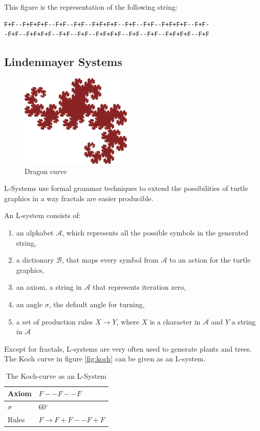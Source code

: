 \documentclass[11pt,a4paper]{article}
\newcommand{\degree}{\ensuremath{^\circ}}
\begin{document}
This figure is the representation of the following string:
\begin{verbatim}
F+F--F+F+F+F--F+F--F+F--F+F+F+F--F+F--F+F--F+F+F+F--F+F-
-F+F--F+F+F+F--F+F--F+F--F+F+F+F--F+F--F+F--F+F+F+F--F+F
\end{verbatim}

\subsection{Lindenmayer Systems}

\begin{figure}[h!]
  \centering
  \includegraphics[]{dragon.png}
  \caption{Dragon curve}
  \label{fig:dragon}
\end{figure}

L-Systems use formal grammar techniques to extend the possibilities of turtle graphics in a way fractals are easier producible. 

An L-system consists of:
\begin{enumerate}
\item an alphabet $\mathcal{A}$, which represents all the possible symbols in the generated string,
\item a dictionary $\mathcal{B}$, that maps every symbol from $\mathcal{A}$ to an action for the turtle graphics,
\item an axiom, a string in $\mathcal{A}$ that represents iteration zero,
\item an angle $\sigma$, the default angle for turning,
\item a set of production rules $X \rightarrow Y$, where $X$ is a character in $\mathcal{A}$ and $Y$ a string in $\mathcal{A}$
\end{enumerate}
\label{enum:definition}

Except for fractals, L-systems are very often used to generate plants and trees. The Koch curve in figure \ref{fig:koch} can be given as an L-system.

\begin{table}
\center
\begin{tabular}{l l}
Axiom & $F--F--F$ \\ \hline
$\sigma$ & 60\degree \\ \hline
Rules & $F \rightarrow F+F--F+F$ \\
\end{tabular}
\caption{The Koch-curve as an L-System}
\end{table}
\end{document}
